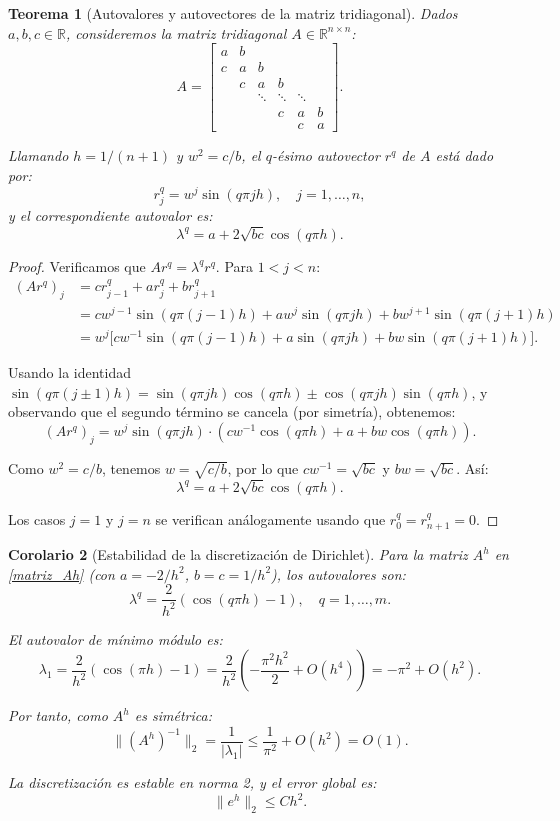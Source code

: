 \documentclass[a4paper,11pt]{report}
\newtheorem{theorem}{Teorema}[chapter]
\newtheorem{corollary}[theorem]{Corolario}
\begin{document}
\begin{theorem}[Autovalores y autovectores de la matriz tridiagonal]
Dados $a,b,c \in \mathbb{R}$, consideremos la matriz tridiagonal $A \in \mathbb{R}^{n \times n}$:
\[
A= \left[
\begin{array}{ccccccc}
a & b & & & & \\
 c & a & b &  & & \\
   & c & a & b & &  \\
 & &\ddots & \ddots & \ddots & \\ 
& & & c & a & b \\
& & &  & c & a
\end{array}
\right].
\]

Llamando $h = 1/(n+1)$ y $w^2 = c/b$, el $q$-ésimo autovector $r^q$ de $A$ está dado por:
\[
r_{j}^q = w^{j} \sin(q \pi j h), \quad j = 1, \ldots, n,
\]
y el correspondiente autovalor es:
\[
\lambda^q=a + 2\sqrt{bc}\cos(q\pi h).
\]
\end{theorem}
\begin{proof}
Verificamos que $Ar^q = \lambda^q r^q$. Para $1 < j < n$:
\begin{align*}
  (Ar^q)_j & = c r_{j-1}^q + a r_{j}^q + b r_{j+1}^q \\
           & = c w^{j-1} \sin(q \pi (j-1) h) + a w^{j} \sin(q \pi j h) + b w^{j+1} \sin(q \pi (j+1) h)  \\
           & = w^{j} \Big[ c w^{-1} \sin(q\pi(j-1)h) + a \sin(q \pi j h) + b w \sin(q\pi(j+1)h) \Big].
\end{align*}

Usando la identidad $\sin(q\pi(j \pm 1)h) = \sin(q\pi jh)\cos(q\pi h) \pm \cos(q\pi jh)\sin(q\pi h)$, y observando que el segundo término se cancela (por simetría), obtenemos:
\[
(Ar^q)_j = w^{j} \sin(q\pi jh) \cdot \left( c w^{-1} \cos(q\pi h) + a + b w \cos(q\pi h) \right).
\]

Como $w^2 = c/b$, tenemos $w = \sqrt{c/b}$, por lo que $cw^{-1} = \sqrt{bc}$ y $bw = \sqrt{bc}$. Así:
\[
\lambda^q = a + 2\sqrt{bc}\cos(q\pi h).
\]

Los casos $j=1$ y $j=n$ se verifican análogamente usando que $r_0^q = r_{n+1}^q = 0$.
\end{proof}

\begin{corollary}[Estabilidad de la discretización de Dirichlet]
Para la matriz $A^h$ en \eqref{matriz_Ah} (con $a = -2/h^2$, $b = c = 1/h^2$), los autovalores son:
\[
\lambda^q = \frac{2}{h^2} \left( \cos(q\pi h) - 1 \right), \quad q = 1, \ldots, m.
\]

El autovalor de mínimo módulo es:
\[
\lambda_1 = \frac{2}{h^2} \left( \cos(\pi h) - 1 \right) = \frac{2}{h^2} \left( -\frac{\pi^2 h^2}{2} + O(h^4) \right) = -\pi^2 + O(h^2).
\]

Por tanto, como $A^h$ es simétrica:
\[
\| (A^h)^{-1} \|_2 = \frac{1}{|\lambda_1|} \leq \frac{1}{\pi^2} + O(h^2) = O(1).
\]

La discretización es estable en norma 2, y el error global es:
\[
\| e^h \|_2 \leq C h^2.
\]
\end{corollary}
\end{document}
